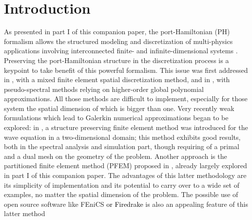 \documentclass[11pt]{article}
\newcommand{\revTwo}[1]{\textcolor{black}{#1}}
\begin{document}
	\section*{Introduction}
	As presented in part I of this companion paper, the port-Hamiltonian (PH) formalism \cite{BookZwart, bookPHs, Villegas} allows the structured modeling and discretization of multi-physics applications involving interconnected finite- and infinite-dimensional systems \cite{Cervera2007,ShaftIntInfinite}. Preserving the port-Hamiltonian structure in the discretization process is a keypoint to take benefit of this powerful formalism. This issue was first addressed in \cite{Golo}, with a mixed finite element spatial discretization method, and in \cite{moulla:hal-01625008}, with pseudo-spectral methods relying on higher-order global polynomial approximations. All those methods are difficult to implement, especially for those system the spatial dimension of which is bigger than one. Very recently weak formulations which lead to Galerkin numerical approximations began to be explored: in \cite{WeakForm_Kot}, a structure preserving finite element method was introduced for the wave equation in a two-dimensional domain; this method exhibits good results, both in the spectral analysis and simulation part, though requiring of a primal and a dual mesh on the geometry of the problem. Another approach is the partitioned finite element method (PFEM) proposed in \cite{CardosoRibeiro2018}, already largely explored in part I of this companion paper. The advantages of this latter methodology are its simplicity of implementation and its potential to carry over to a wide set of examples, no matter the spatial dimension of the problem. The possible use of open source software like FEniCS \cite{LoggMardalEtAl2012} \revTwo{or Firedrake \cite{firedrake}} is also an appealing feature of this latter method  \\
	
\end{document}
